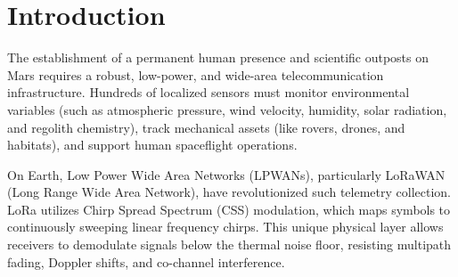 \documentclass{ijuc}
\begin{document}

\section{Introduction}
\label{sec:intro}
The establishment of a permanent human presence and scientific outposts on Mars requires a robust, low-power, and wide-area telecommunication infrastructure. Hundreds of localized sensors must monitor environmental variables (such as atmospheric pressure, wind velocity, humidity, solar radiation, and regolith chemistry), track mechanical assets (like rovers, drones, and habitats), and support human spaceflight operations. 

On Earth, Low Power Wide Area Networks (LPWANs), particularly LoRaWAN (Long Range Wide Area Network), have revolutionized such telemetry collection. LoRa utilizes Chirp Spread Spectrum (CSS) modulation, which maps symbols to continuously sweeping linear frequency chirps. This unique physical layer allows receivers to demodulate signals below the thermal noise floor, resisting multipath fading, Doppler shifts, and co-channel interference.
\end{document}
